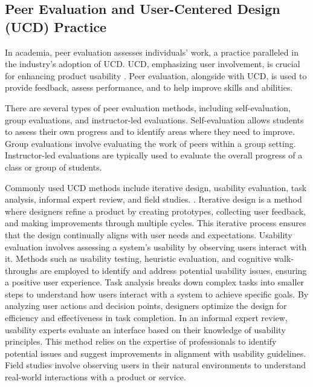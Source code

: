 \documentclass[10pt,twocolumn]{article}
\begin{document}
\subsection{Peer Evaluation and User-Centered Design (UCD) Practice} 
In academia, peer evaluation assesses individuals' work, a practice paralleled in the industry's adoption of UCD. UCD, emphasizing user involvement, is crucial for enhancing product usability \cite{mao2005}. Peer evaluation, alongside with UCD, is used to provide feedback, assess performance, and to help improve skills and abilities.

There are several types of peer evaluation methods, including self-evaluation, group evaluations, and instructor-led evaluations. Self-evaluation allows students to assess their own progress and to identify areas where they need to improve. Group evaluations involve evaluating the work of peers within a group setting. Instructor-led evaluations are typically used to evaluate the overall progress of a class or group of students. 

Commonly used UCD methods include iterative design, usability evaluation, task analysis, informal expert review, and field studies. \cite{mao2005}. Iterative design is a method where designers refine a product by creating prototypes, collecting user feedback, and making improvements through multiple cycles. This iterative process ensures that the design continually aligns with user needs and expectations. Usability evaluation involves assessing a system's usability by observing users interact with it. Methods such as usability testing, heuristic evaluation, and cognitive walk-throughs are employed to identify and address potential usability issues, ensuring a positive user experience. Task analysis breaks down complex tasks into smaller steps to understand how users interact with a system to achieve specific goals. By analyzing user actions and decision points, designers optimize the design for efficiency and effectiveness in task completion. In an informal expert review, usability experts evaluate an interface based on their knowledge of usability principles. This method relies on the expertise of professionals to identify potential issues and suggest improvements in alignment with usability guidelines. Field studies involve observing users in their natural environments to understand real-world interactions with a product or service. 
\end{document}
